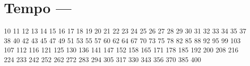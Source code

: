 \section{Tempo --- \UiKey{\I}\UiKey{\MET}}
10  
11  
12  
13  
14  
15  
16  
17  
18  
19 
20 
21 
22 
23 
24 
25 
26 
27 
28 
29 
30 
31 
32 
33 
34 
35 
37 
38 
40 
42 
43 
45 
47 
49 
51 
53 
55 
57 
60 
62 
64 
67 
70 
73 
75 
78 
82 
85 
88 
92 
95 
99 
103
107
112
116
121
125
130
136
141
147
152
158
165
171
178
185
192
200
208
216
224
233
242
252
262
272
283
294
305
317
330
343
356
370
385
400
